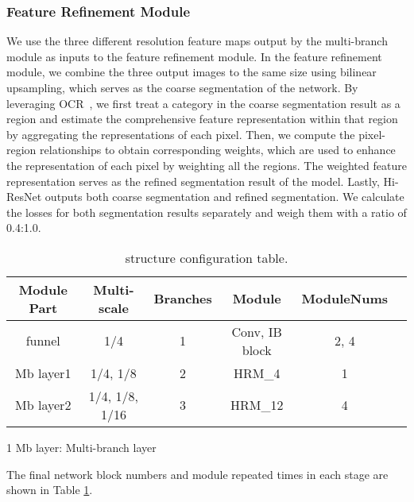 \documentclass[journal]{IEEEtran}
\begin{document}
\subsubsection{Feature Refinement Module}
We use the three different resolution feature maps output by the multi-branch module as inputs to the feature refinement module. In the feature refinement module, we combine the three output images to the same size using bilinear upsampling, which serves as the coarse segmentation of the network. By leveraging OCR~\cite{yuan2019segmentation}, we first treat a category in the coarse segmentation result as a region and estimate the comprehensive feature representation within that region by aggregating the representations of each pixel. Then, we compute the pixel-region relationships to obtain corresponding weights, which are used to enhance the representation of each pixel by weighting all the regions. The weighted feature representation serves as the refined segmentation result of the model. Lastly, Hi-ResNet outputs both coarse segmentation and refined segmentation. We calculate the losses for both segmentation results separately and weigh them with a ratio of 0.4:1.0.


\begin{table}[!ht]
  \begin{center}
  \begin{threeparttable}
  \scriptsize
    \caption{structure configuration table.}
    \begin{tabular}{c|c c c c c}
    \hline
      \textbf{Module Part} & \textbf{Multi-scale} & \textbf{Branches} & \textbf{Module} & \textbf{ModuleNums}\\
      \hline
      funnel & 1/4 & 1 & Conv, IB block & 2, 4\\
      Mb layer1 & 1/4, 1/8 & 2 & HRM\_4 & 1\\
      Mb layer2 & 1/4, 1/8, 1/16 & 3 & HRM\_12 & 4\\
      \hline
    \end{tabular}
        \begin{tablenotes}
        \footnotesize  
        \item[1] Mb layer: Multi-branch layer
      \end{tablenotes} 
    \end{threeparttable}
  \end{center}
  \label{table:1}
\end{table}
The final network block numbers and module repeated times in each stage are shown in Table \ref{table:1}.
\end{document}
